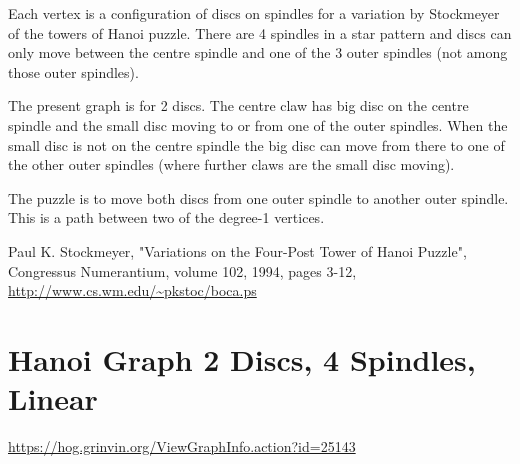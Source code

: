 \documentclass{article}
\begin{document}
Each vertex is a configuration of discs on spindles for a variation by
Stockmeyer of the towers of Hanoi puzzle.  There are 4 spindles in a
star pattern and discs can only move between the centre spindle and
one of the 3 outer spindles (not among those outer spindles).

The present graph is for 2 discs.  The centre claw has big disc on the
centre spindle and the small disc moving to or from one of the outer
spindles.  When the small disc is not on the centre spindle the big
disc can move from there to one of the other outer spindles (where
further claws are the small disc moving).

The puzzle is to move both discs from one outer spindle to another outer 
spindle.  This is a path between two of the degree\hyp{}1 vertices. 

Paul K. Stockmeyer, "Variations on the Four-Post Tower of Hanoi
Puzzle", Congressus Numerantium, volume 102, 1994, pages 3-12,
\url{http://www.cs.wm.edu/~pkstoc/boca.ps}


\section{Hanoi Graph 2 Discs, 4 Spindles, Linear}

\url{https://hog.grinvin.org/ViewGraphInfo.action?id=25143}


\begin{center}
\end{center}
\end{document}
